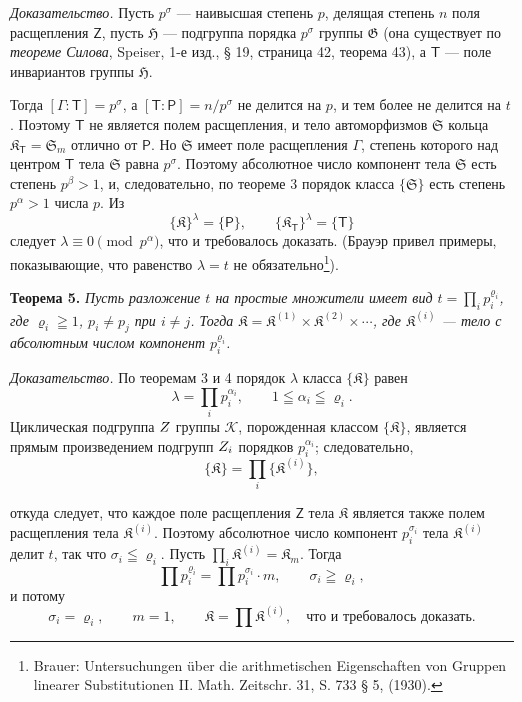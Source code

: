 \documentclass[11pt]{article}
\newcommand{\srcfn}[2]{\footnote{#2}}
\begin{document}
\emph{Доказательство.} Пусть \(p^\sigma\) --- наивысшая степень \(p\), делящая степень \(n\) поля расщепления \(\mathsf{Z}\), пусть \(\mathfrak H\) --- подгруппа порядка \(p^\sigma\) группы \(\mathfrak G\) (она существует по \emph{теореме Силова}, Speiser, 1-е изд., § 19, страница 42, теорема 43), а \(\mathsf{T}\) --- поле инвариантов группы \(\mathfrak H\).

Тогда \([\Gamma:\mathsf{T}]=p^\sigma\), а \([\mathsf{T}:\mathsf P]=n/p^\sigma\) не делится на \(p\), и тем более не делится на \(t\). Поэтому \(\mathsf{T}\) не является полем расщепления, и тело автоморфизмов \(\mathfrak S\) кольца \(\mathfrak K_{\mathsf{T}}=\mathfrak S_m\) отлично от \(\mathsf P\). Но \(\mathfrak S\) имеет поле расщепления \(\Gamma\), степень которого над центром \(\mathsf{T}\) тела \(\mathfrak S\) равна \(p^\sigma\). Поэтому абсолютное число компонент тела \(\mathfrak S\) есть степень \(p^\beta>1\), и, следовательно, по теореме 3 порядок класса \(\{\mathfrak S\}\) есть степень \(p^\alpha>1\) числа \(p\). Из
\[
\{\mathfrak K\}^{\lambda}=\{\mathsf P\},
\qquad
\{\mathfrak K_{\mathsf{T}}\}^{\lambda}=\{\mathsf{T}\}
\]
следует \(\lambda\equiv0\pmod {p^\alpha}\), что и требовалось доказать. (Брауэр привел примеры, показывающие, что равенство \(\lambda=t\) не обязательно\srcfn{1}{Brauer: Untersuchungen über die arithmetischen Eigenschaften von Gruppen linearer Substitutionen II. Math. Zeitschr. 31, S. 733 § 5, (1930).}).

\textbf{Теорема 5.} \emph{Пусть разложение \(t\) на простые множители имеет вид \(t=\prod_i p_i^{\varrho_i}\), где \(\varrho_i\geqq1\), \(p_i\ne p_j\) при \(i\ne j\). Тогда \(\mathfrak K=\mathfrak K^{(1)}\times\mathfrak K^{(2)}\times\cdots\), где \(\mathfrak K^{(i)}\) --- тело с абсолютным числом компонент \(p_i^{\varrho_i}\).}

\emph{Доказательство.} По теоремам 3 и 4 порядок \(\lambda\) класса \(\{\mathfrak K\}\) равен
\[
\lambda=\prod_i p_i^{\alpha_i},\qquad 1\leqq\alpha_i\leqq\varrho_i.
\]
Циклическая подгруппа \(\mathscr \mathsf{Z}\) группы \(\mathscr K\), порожденная классом \(\{\mathfrak K\}\), является прямым произведением подгрупп \(\mathscr \mathsf{Z}_i\) порядков \(p_i^{\alpha_i}\); следовательно,
\[
\{\mathfrak K\}=\prod_i\{\mathfrak K^{(i)}\},
\]

откуда следует, что каждое поле расщепления \(\mathsf{Z}\) тела \(\mathfrak K\) является также полем расщепления тела \(\mathfrak K^{(i)}\). Поэтому абсолютное число компонент \(p_i^{\sigma_i}\) тела \(\mathfrak K^{(i)}\) делит \(t\), так что \(\sigma_i\leqq\varrho_i\). Пусть \(\prod_i \mathfrak K^{(i)}=\mathfrak K_m\). Тогда
\[
\prod p_i^{\varrho_i}=\prod p_i^{\sigma_i}\cdot m,
\qquad
\sigma_i\geqq\varrho_i,
\]
и потому
\[
\sigma_i=\varrho_i,\qquad m=1,\qquad
\mathfrak K=\prod \mathfrak K^{(i)},
\quad\text{что и требовалось доказать.}
\]
\end{document}
